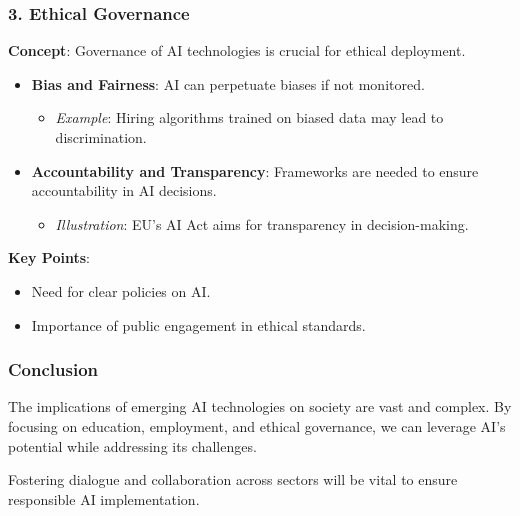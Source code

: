 \documentclass[aspectratio=169]{beamer}
\begin{document}
\begin{frame}[fragile]
    \frametitle{3. Ethical Governance}
    \textbf{Concept}: Governance of AI technologies is crucial for ethical deployment.

    \begin{itemize}
        \item \textbf{Bias and Fairness}: AI can perpetuate biases if not monitored.
        \begin{itemize}
            \item \textit{Example}: Hiring algorithms trained on biased data may lead to discrimination.
        \end{itemize}
        
        \item \textbf{Accountability and Transparency}: Frameworks are needed to ensure accountability in AI decisions.
        \begin{itemize}
            \item \textit{Illustration}: EU’s AI Act aims for transparency in decision-making.
        \end{itemize}
    \end{itemize}
    
    \textbf{Key Points}:
    \begin{itemize}
        \item Need for clear policies on AI.
        \item Importance of public engagement in ethical standards.
    \end{itemize}
\end{frame}

\begin{frame}[fragile]
    \frametitle{Conclusion}
    The implications of emerging AI technologies on society are vast and complex. 
    By focusing on education, employment, and ethical governance, we can leverage AI's potential while addressing its challenges. 

    Fostering dialogue and collaboration across sectors will be vital to ensure responsible AI implementation.
\end{frame}
\end{document}
